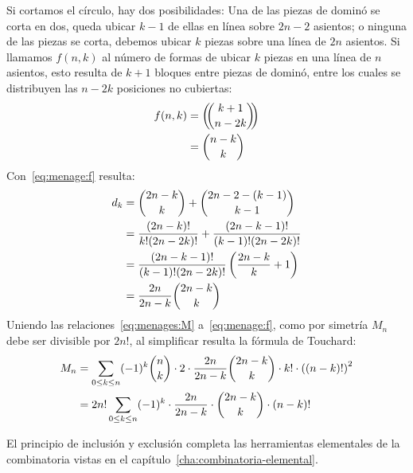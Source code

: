   Si cortamos el círculo,
  hay dos posibilidades:
  Una de las piezas de dominó se corta en dos,
  queda ubicar \(k - 1\) de ellas en línea
  sobre \(2 n - 2\) asientos;
  o ninguna de las piezas se corta,
  debemos ubicar \(k\) piezas sobre una línea de \(2 n\) asientos.
  Si llamamos \(f(n, k)\) al número de formas
  de ubicar \(k\) piezas en una línea de \(n\) asientos,
  esto resulta de \(k + 1\) bloques entre piezas de dominó,
  entre los cuales se distribuyen
  las \(n - 2 k\) posiciones no cubiertas:
  \begin{align}
    f(n, k)
      &= \left( \!\! \binom{k + 1}{n - 2 k} \!\! \right) \notag \\
      &= \binom{n - k}{k}
	    \label{eq:menage:f}
  \end{align}
  Con~\eqref{eq:menage:f} resulta:
  \begin{align}
    d_k
      &= \binom{2 n - k}{k} + \binom{2 n - 2 - (k - 1)}{k - 1}
	      \notag \\
      &= \frac{(2 n - k)!}{k! (2 n - 2 k)!}
	   + \frac{(2 n - k - 1)!}{(k - 1)! (2 n - 2 k)!}
	      \notag \\
      &= \frac{(2 n - k - 1)!}{(k - 1)! (2 n - 2 k)!}
	   \left(
	     \frac{2 n - k}{k}
	       + 1
	   \right)
	      \notag \\
      &= \frac{2 n}{2 n - k} \binom{2 n - k}{k}
	      \label{eq:menage:d}
  \end{align}
  Uniendo las relaciones~\eqref{eq:menages:M} a~\eqref{eq:menage:f},
  como por simetría \(M_n\) debe ser divisible por \(2 n!\),
  al simplificar resulta la fórmula de Touchard:%
  \begin{align}
    M_n
      &= \sum_{0 \le k \le n}
	   (-1)^k \binom{n}{k}
	      \cdot 2
	      \cdot \frac{2 n}{2 n - k} \binom{2 n - k}{k}
	      \cdot k! \cdot \left( (n - k)! \right)^2 \notag \\
      &= 2 n! \sum_{0 \le k \le n}
		(-1)^k \cdot \frac{2 n}{2 n - k}
		       \cdot \binom{2 n - k}{k}
		       \cdot (n - k)!
	  \label{eq:menages}
  \end{align}

  El principio de inclusión y exclusión
  completa las herramientas elementales
  de la combinatoria vistas
  en el capítulo~\ref{cha:combinatoria-elemental}.


